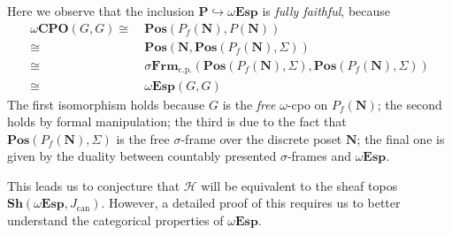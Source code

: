 \documentclass[a4paper,12pt]{amsart}
\theoremstyle{definition}
\newcommand{\mc}[1]{\mathcal{#1}}
\newcommand{\mb}[1]{\mathbf{#1}}
\newcommand{\mr}[1]{\mathrm{#1}}
\newcommand{\Pos}{\mb{Pos}}
\newcommand{\sh}{\mb{Sh}}
\newcommand{\hook}{\hookrightarrow}
\newcommand{\cp}{_{\mr{c.p.}}}
\newcommand{\N}{\mb N}
\newcommand{\wCPO}{\omega\mb{CPO}}
\newcommand{\sFrm}{\sigma\mb{Frm}}
\newcommand{\wTop}{\omega\mb{Esp}}
\begin{document}
Here we observe that the inclusion $\mb P \hook \wTop$ is \emph{fully faithful}, because
\begin{align*}
  \wCPO(G,G)
  \cong\ & \Pos(P_f(\N),P(\N)) \\
  \cong\ & \Pos(\N,\Pos(P_f(\N),\Sigma)) \\
  \cong\ & \sFrm\cp(\Pos(P_f(\N),\Sigma),\Pos(P_f(\N),\Sigma)) \\ 
  \cong\ & \wTop(G,G)
\end{align*}
The first isomorphism holds because $G$ is the \emph{free} $\omega$-cpo on $P_f(\N)$; the second holds by formal manipulation; the third is due to the fact that $\Pos(P_f(\N),\Sigma)$ is the free $\sigma$-frame over the discrete poset $\N$; the final one is given by the duality between countably presented $\sigma$-frames and $\wTop$. 

This leads us to conjecture that $\mc H$ will be equivalent to the sheaf topos $\sh(\wTop,J_{\mr{can}})$. However, a detailed proof of this requires us to better understand the categorical properties of $\wTop$.

 

\end{document}
